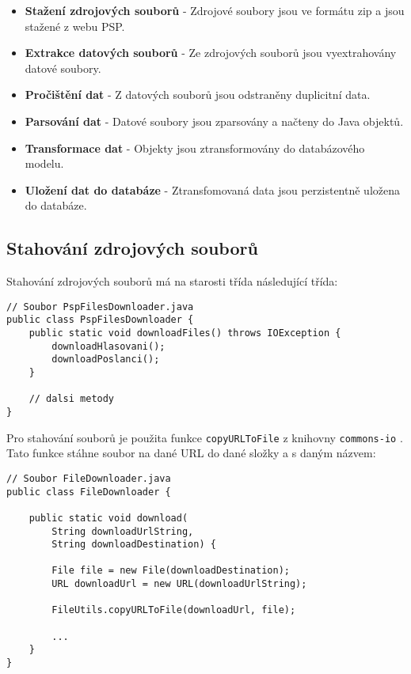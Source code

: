 \begin{itemize}
	\item \textbf{Stažení zdrojových souborů} - Zdrojové soubory jsou ve formátu zip a jsou stažené z webu PSP.
	\item \textbf{Extrakce datových souborů} - Ze zdrojových souborů jsou vyextrahovány datové soubory.
	\item \textbf{Pročištění dat} - Z datových souborů jsou odstraněny duplicitní data.
	\item \textbf{Parsování dat} - Datové soubory jsou zparsovány a načteny do Java objektů.
	\item \textbf{Transformace dat} -  Objekty jsou ztransformovány do databázového modelu.
	\item \textbf{Uložení dat do databáze} - Ztransfomovaná data jsou perzistentně uložena do databáze.
\end{itemize}

\subsection{Stahování zdrojových souborů}
Stahování zdrojových souborů má na starosti třída následující třída:

\begin{lstlisting}[caption={Třída pro stahování zdrojových souborů}, label={lst:psp-downloader}, tabsize=2]
// Soubor PspFilesDownloader.java
public class PspFilesDownloader {
	public static void downloadFiles() throws IOException {
		downloadHlasovani();
		downloadPoslanci();
	}

	// dalsi metody
}
\end{lstlisting}

\noindent Pro stahování souborů je použita funkce \lstinline|copyURLToFile| z knihovny \lstinline|commons-io| \cite{commons-io}. Tato funkce stáhne soubor na dané URL do dané složky a s daným názvem:

\begin{lstlisting}[caption={Ukázka stahování dat pomocí knihovny \lstinline|commons-io|}, label={lst:common-io-downloader}, tabsize=2]
// Soubor FileDownloader.java
public class FileDownloader {
	
	public static void download(
		String downloadUrlString, 
		String downloadDestination) {
		
		File file = new File(downloadDestination);
		URL downloadUrl = new URL(downloadUrlString);
		
		FileUtils.copyURLToFile(downloadUrl, file);
	
		...
	}
}
\end{lstlisting}

